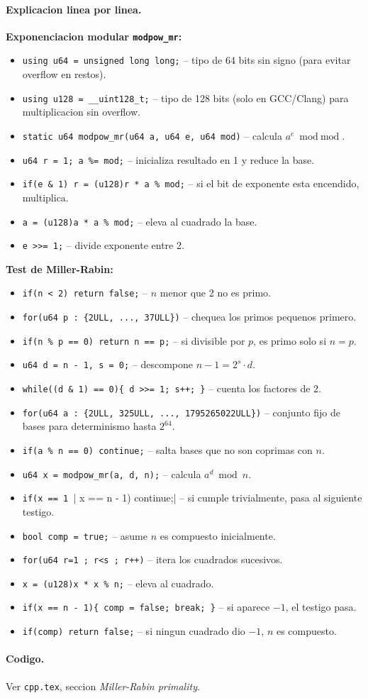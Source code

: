 \paragraph{Explicacion linea por linea.}
\textbf{Exponenciacion modular \texttt{modpow\_mr}:}
\begin{itemize}\setlength\itemsep{0pt}
	\item \verb|using u64 = unsigned long long;| -- tipo de 64 bits sin signo (para evitar overflow en restos).
	\item \verb|using u128 = __uint128_t;| -- tipo de 128 bits (solo en GCC/Clang) para multiplicacion sin overflow.
	\item \verb|static u64 modpow_mr(u64 a, u64 e, u64 mod)| -- calcula $a^e \bmod \text{mod}$.
	\item \verb|u64 r = 1; a %= mod;| -- inicializa resultado en 1 y reduce la base.
	\item \verb|if(e & 1) r = (u128)r * a % mod;| -- si el bit de exponente esta encendido, multiplica.
	\item \verb|a = (u128)a * a % mod;| -- eleva al cuadrado la base.
	\item \verb|e >>= 1;| -- divide exponente entre 2.
\end{itemize}
\textbf{Test de Miller-Rabin:}
\begin{itemize}\setlength\itemsep{0pt}
	\item \verb|if(n < 2) return false;| -- $n$ menor que 2 no es primo.
	\item \verb|for(u64 p : {2ULL, ..., 37ULL})| -- chequea los primos pequenos primero.
	\item \verb|if(n % p == 0) return n == p;| -- si divisible por $p$, es primo solo si $n = p$.
	\item \verb|u64 d = n - 1, s = 0;| -- descompone $n-1 = 2^s \cdot d$.
	\item \verb|while((d & 1) == 0){ d >>= 1; s++; }| -- cuenta los factores de 2.
	\item \verb|for(u64 a : {2ULL, 325ULL, ..., 1795265022ULL})| -- conjunto fijo de bases para determinismo hasta $2^{64}$.
	\item \verb|if(a % n == 0) continue;| -- salta bases que no son coprimas con $n$.
	\item \verb|u64 x = modpow_mr(a, d, n);| -- calcula $a^d \bmod n$.
	\item \verb|if(x == 1 || x == n - 1) continue;| -- si cumple trivialmente, pasa al siguiente testigo.
	\item \verb|bool comp = true;| -- asume $n$ es compuesto inicialmente.
	\item \verb|for(u64 r=1 ; r<s ; r++)| -- itera los cuadrados sucesivos.
	\item \verb|x = (u128)x * x % n;| -- eleva al cuadrado.
	\item \verb|if(x == n - 1){ comp = false; break; }| -- si aparece $-1$, el testigo pasa.
	\item \verb|if(comp) return false;| -- si ningun cuadrado dio $-1$, $n$ es compuesto.
\end{itemize}

\paragraph{Codigo.}
Ver \texttt{cpp.tex}, seccion \textit{Miller-Rabin primality}.

\vspace{0.5em|||}
